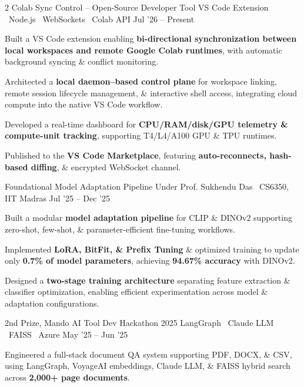 \documentclass{resume}
\begin{document}
\begin{paracol}{2}
\resumeProject
{Colab Sync Control -- Open-Source Developer Tool \href{https://marketplace.visualstudio.com/items?itemName=crimson-blitz.colab-sync-vscode}{\small\faGlobe}}
{VS Code Extension \textbar\ Node.js \textbar\ WebSockets \textbar\ Colab API}
{Jul '26 -- Present}
{
\begin{resumeItemize}
\item Built a VS Code extension enabling \textbf{bi-directional synchronization between local workspaces and remote Google Colab runtimes}, with automatic background syncing \& conflict monitoring.
\item Architected a \textbf{local daemon--based control plane} for workspace linking, remote session lifecycle management, \& interactive shell access, integrating cloud compute into the native VS Code workflow.
\item Developed a real-time dashboard for \textbf{CPU/RAM/disk/GPU telemetry \& compute-unit tracking}, supporting T4/L4/A100 GPU \& TPU runtimes.
\item Published to the \textbf{VS Code Marketplace}, featuring \textbf{auto-reconnects, hash-based diffing}, \& encrypted WebSocket channel.
\end{resumeItemize}
}
{\href{https://github.com/NikhilSwaroop-P/colab-sync-vscode}{\faGithub}}
\resumeDivider

\resumeProject
{Foundational Model Adaptation Pipeline \href{https://hemanthdatta.github.io/tpa-17-blog/}{\small\faFile}}
{Under Prof. Sukhendu Das \textbar\ CS6350, IIT Madras}
{Jul '25 -- Dec '25}
{
\begin{resumeItemize}
\item Built a modular \textbf{model adaptation pipeline} for CLIP \& DINOv2 supporting zero-shot, few-shot, \& parameter-efficient fine-tuning workflows.
\item Implemented \textbf{LoRA, BitFit, \& Prefix Tuning} \& optimized training to update only \textbf{0.7\% of model parameters}, achieving \textbf{94.67\% accuracy} with DINOv2.
\item Designed a \textbf{two-stage training architecture} separating feature extraction \& classifier optimization, enabling efficient experimentation across model \& adaptation configurations.
\end{resumeItemize}
}
{\href{https://github.com/hemanthdatta/tpa-17}{\faGithub}}


\resumeProject
{2nd Prize, Mando AI Tool Dev Hackathon 2025}
{LangGraph \textbar\ Claude LLM \textbar\ FAISS \textbar\ Azure}
{May '25 -- Jun '25}
{
\begin{resumeItemize}
\item Engineered a full-stack document QA system supporting PDF, DOCX, \& CSV, using LangGraph, VoyageAI embeddings, Claude LLM, \& FAISS hybrid search across \textbf{2,000+ page documents}.
\end{resumeItemize}
}
{\href{https://github.com/hemanthdatta}{\faGithub}}


\end{paracol}
\end{document}
